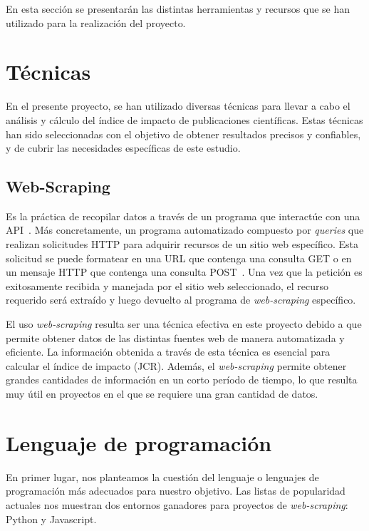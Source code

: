 
En esta sección se presentarán las distintas herramientas y recursos que se han utilizado para la realización del proyecto. 


\section{Técnicas}
En el presente proyecto, se han utilizado diversas técnicas para llevar a cabo el análisis y cálculo del índice de impacto de publicaciones científicas. Estas técnicas han sido seleccionadas con el objetivo de obtener resultados precisos y confiables, y de cubrir las necesidades específicas de este estudio.

\subsection{Web-Scraping}
Es la práctica de recopilar datos a través de un programa que interactúe con una API~\cite{mitchell2018}. Más concretamente, un programa automatizado compuesto por \textit{queries} que realizan solicitudes HTTP para adquirir recursos de un sitio web específico. Esta solicitud se puede formatear en una URL que contenga una consulta GET o en un mensaje HTTP que contenga una consulta POST~\cite{zhao2017}. Una vez que la petición es exitosamente recibida y manejada por el sitio web seleccionado, el recurso requerido será extraído y luego devuelto al programa de \textit{web-scraping} específico.

El uso \textit{web-scraping} resulta ser una técnica efectiva en este proyecto debido a que permite obtener datos de las distintas fuentes web de manera automatizada y eficiente. La información obtenida a través de esta técnica es esencial para calcular el índice de impacto (JCR). Además, el \textit{web-scraping} permite obtener grandes cantidades de información en un corto período de tiempo, lo que resulta muy útil en proyectos en el que se requiere una gran cantidad de datos.


\section{Lenguaje de programación}
En primer lugar, nos planteamos la cuestión del lenguaje o lenguajes de programación más adecuados para nuestro objetivo. Las listas de popularidad actuales nos muestran dos entornos ganadores para proyectos de \textit{web-scraping}: Python y Javascript.

